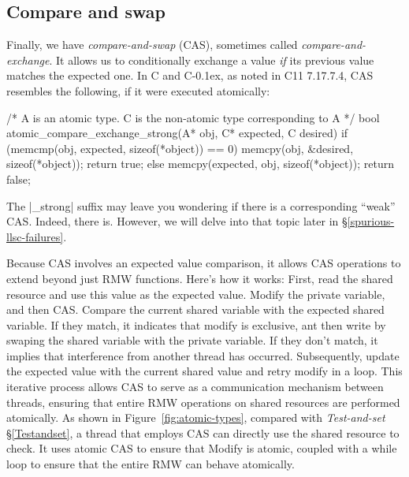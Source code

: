 \documentclass[fontsize=10pt, oneside]{scrartcl}
\newcommand{\cplusplus}[1]{C\kern-0.1ex\raisebox{0.15ex}{\texttt{++}}}
\newcommand{\clang}[1]{C}
\newcommand{\fig}[1]{Figure~\ref{#1}}
\newcommand{\introduce}[1]{\textit{#1}}
\newcommand{\secref}[1]{\hyperref[#1]{\textsc{\S}\ref*{#1}}}
\begin{document}
\subsection{Compare and swap}
\label{cas}
Finally, we have \introduce{compare-and-swap} (\textsc{CAS}),
sometimes called \introduce{compare-and-exchange}.
It allows us to conditionally exchange a value \emph{if} its previous value matches the expected one.
In \clang{} and \cplusplus{}, as noted in C11 7.17.7.4, \textsc{CAS} resembles the following,
if it were executed atomically:
\begin{ccode}
/* A is an atomic type. C is the non-atomic type corresponding to A */
bool atomic_compare_exchange_strong(A* obj, C* expected, C desired)
{
    if (memcmp(obj, expected, sizeof(*object)) == 0) {
        memcpy(obj, &desired, sizeof(*object));
        return true;
    } else {
        memcpy(expected, obj, sizeof(*object));
        return false;
    }
}
\end{ccode}

\begin{samepage}
\noindent The \cpp|_strong| suffix may leave you wondering if there is a corresponding ``weak'' \textsc{CAS}.
Indeed, there is. However, we will delve into that topic later in \secref{spurious-llsc-failures}.
\end{samepage}

Because \textsc{CAS} involves an expected value comparison, 
it allows \textsc{CAS} operations to extend beyond just \textsc{RMW} functions. 
Here's how it works: First, read the shared resource and use this value as the expected value. 
Modify the private variable, and then \textsc{CAS}. Compare the current shared variable with the expected shared variable. 
If they match, it indicates that modify is exclusive, ant then write by swaping the shared variable with the private variable.
If they don't match, it implies that interference from another thread has occurred.
Subsequently, update the expected value with the current shared value and retry modify in a loop. 
This iterative process allows \textsc{CAS} to serve as a communication mechanism between threads, 
ensuring that entire \textsc{RMW} operations on shared resources are performed atomically.
As shown in \fig{fig:atomic-types}, compared with \introduce{Test-and-set} \secref{Testandset}, 
a thread that employs \textsc{CAS} can directly use the shared resource to check.
It uses atomic \textsc{CAS} to ensure that Modify is atomic, 
coupled with a while loop to ensure that the entire \textsc{RMW} can behave atomically.
\end{document}
